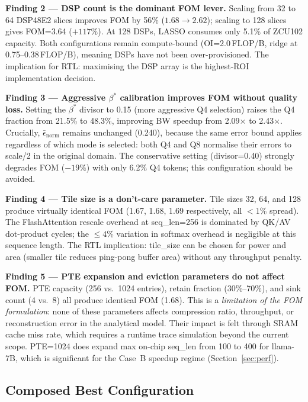 \textbf{Finding 2 --- DSP count is the dominant FOM lever.}
Scaling from 32 to 64 DSP48E2 slices improves FOM by 56\% ($1.68 \to 2.62$);
scaling to 128 slices gives FOM=3.64 ($+117\%$). At 128 DSPs, LASSO
consumes only 5.1\% of ZCU102 capacity.  Both configurations remain
compute-bound (OI=2.0\,FLOP/B, ridge at 0.75--0.38\,FLOP/B), meaning
DSPs have not been over-provisioned.  The implication for RTL: maximising
the DSP array is the highest-ROI implementation decision.

\textbf{Finding 3 --- Aggressive $\beta^*$ calibration improves FOM without quality loss.}
Setting the $\beta^*$ divisor to 0.15 (more aggressive Q4 selection)
raises the Q4 fraction from 21.5\% to 48.3\%, improving BW speedup
from 2.09$\times$ to 2.43$\times$.  Crucially, $\bar\epsilon_\text{norm}$
remains unchanged (0.240), because the same error bound applies
regardless of which mode is selected: both Q4 and Q8 normalise their
errors to scale/2 in the original domain.  The conservative setting
(divisor=0.40) strongly degrades FOM ($-19\%$) with only 6.2\% Q4
tokens; this configuration should be avoided.

\textbf{Finding 4 --- Tile size is a don't-care parameter.}
Tile sizes 32, 64, and 128 produce virtually identical FOM (1.67, 1.68,
1.69 respectively, all $<1\%$ spread).  The FlashAttention rescale
overhead at seq\_len=256 is dominated by QK/AV dot-product cycles; the
${\leq}4\%$ variation in softmax overhead is negligible at this
sequence length.  The RTL implication: tile\_size can be chosen for
power and area (smaller tile reduces ping-pong buffer area) without
any throughput penalty.

\textbf{Finding 5 --- PTE expansion and eviction parameters do not affect FOM.}
PTE capacity (256 vs.\ 1024 entries), retain fraction (30\%--70\%),
and sink count (4 vs.\ 8) all produce identical FOM (1.68).  This is
a \emph{limitation of the FOM formulation}: none of these parameters
affects compression ratio, throughput, or reconstruction error in the
analytical model.  Their impact is felt through SRAM cache miss rate,
which requires a runtime trace simulation beyond the current scope.
PTE=1024 does expand max on-chip seq\_len from 100 to 400 for llama-7B,
which is significant for the Case~B speedup regime (Section~\ref{sec:perf}).

\subsection{Composed Best Configuration}

